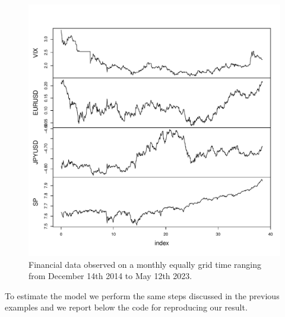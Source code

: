 \begin{figure}

{\centering \includegraphics[width=1\linewidth]{figures/RealDataset} 

}

\caption{Financial data observed on a monthly equally grid time ranging from December 14th 2014 to May 12th 2023.}\label{fig:RealDataset}
\end{figure}

To estimate the model we perform the same steps discussed in the previous examples and we report below the code for reproducing our result.

